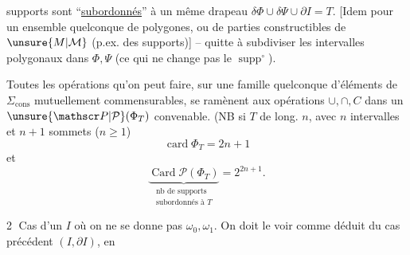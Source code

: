 
supports  sont ``\uline{subordonnés}'' à un même drapeau $\delta\Phi\cup\delta\Psi\cup\partial I=T$. [Idem pour un ensemble quelconque de polygones, ou de parties constructibles de $\unsure{M|\mathcal M}$ (p.ex. des supports)] -- quitte à subdiviser les intervalles polygonaux dans $\Phi,\Psi$ (ce qui ne change pas le $\operatorname{supp}^{\circ}$).

Toutes les opérations  qu'on peut faire, sur une famille quelconque d'éléments de $\Sigma_{\mathrm{cons}}$ mutuellement commensurables, se ramènent aux opérations $\cup,\cap,C$ dans un $\unsure{\mathscr P|\mathcal P}(\Phi_T)$ convenable.
(NB si $T$ de long. $n$, avec $n$ intervalles et $n+1$ sommets ($n\geq1$)
\[
\operatorname{card}\Phi_T=2n+1
\]
et
\[
\underbrace{\operatorname{Card}\mathscr P(\Phi_T)}_{\substack{\text{nb de supports}\\\text{subordonnés à }T}}=2^{2n+1}.
\]

\textcircled{2} Cas d'un $I$ où on ne se donne pas $\omega_0,\omega_1$. On doit le voir comme déduit du cas précédent $(I,\partial I)$, en 
